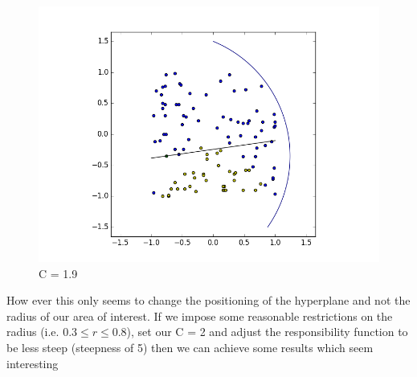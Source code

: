 \documentclass{article}
\begin{document}
\begin{figure}[H]
\begin{minipage}[b]{0.49\textwidth}
    \includegraphics[width=\textwidth]{BoundaryHunter-Attempt3-04.png}
    \caption{C = 1.9}
  \end{minipage}
\end{figure}

How ever this only seems to change the positioning of the hyperplane and not the radius of our area of interest. If we impose some reasonable restrictions on the radius (i.e. $0.3 \leq r \leq 0.8$), set our C = 2 and adjust the responsibility function to be less steep (steepness of 5) then we can achieve some results which seem interesting
\end{document}

